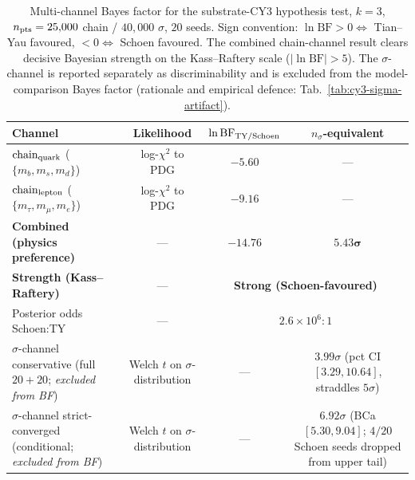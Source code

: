 \begin{table}[t]
\centering
\caption{Multi-channel Bayes factor for the substrate-CY3 hypothesis test, $k=3$, $n_{\rm pts}=25{,}000$ chain / $40{,}000$ $\sigma$, $20$ seeds. Sign convention: $\ln \mathrm{BF} > 0 \Leftrightarrow$ Tian--Yau favoured, $< 0 \Leftrightarrow$ Schoen favoured. The combined chain-channel result clears decisive Bayesian strength on the Kass--Raftery scale ($|\ln \mathrm{BF}| > 5$). The $\sigma$-channel is reported separately as discriminability and is excluded from the model-comparison Bayes factor (rationale and empirical defence: Tab.~\ref{tab:cy3-sigma-artifact}).}
\label{tab:cy3-bayesian-channels}
\begin{ruledtabular}
\begin{tabular}{lccc}
Channel & Likelihood & $\ln \mathrm{BF}_{\rm TY/Schoen}$ & $n_\sigma$-equivalent \\
\hline
$\mathrm{chain}_{\rm quark}$ ($\{m_b, m_s, m_d\}$) & log-$\chi^2$ to PDG & $-5.60$ & --- \\
$\mathrm{chain}_{\rm lepton}$ ($\{m_\tau, m_\mu, m_e\}$) & log-$\chi^2$ to PDG & $-9.16$ & --- \\
\hline
\textbf{Combined (physics preference)} & --- & $\mathbf{-14.76}$ & $\mathbf{5.43\sigma}$ \\
\textbf{Strength (Kass--Raftery)} & --- & \multicolumn{2}{c}{\textbf{Strong (Schoen-favoured)}} \\
Posterior odds Schoen:TY & --- & \multicolumn{2}{c}{$2.6 \times 10^6 : 1$} \\
\hline
$\sigma$-channel conservative (full $20{+}20$; \emph{excluded from BF}) & Welch $t$ on $\sigma$-distribution & --- & $3.99\sigma$ (pct CI $[3.29, 10.64]$, straddles $5\sigma$) \\
$\sigma$-channel strict-converged (conditional; \emph{excluded from BF}) & Welch $t$ on $\sigma$-distribution & --- & $6.92\sigma$ (BCa $[5.30, 9.04]$; $4/20$ Schoen seeds dropped from upper tail) \\
\end{tabular}
\end{ruledtabular}
\end{table}
